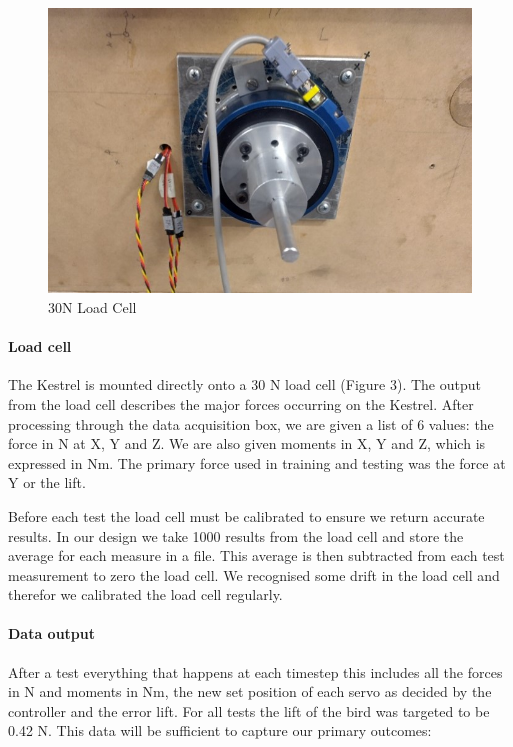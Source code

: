     \begin{figure}
        \includegraphics[width=\textwidth/2]{./Resources/Fig3_load_cell.jpg}
        \caption{\label{fig:figure 3} 30N Load Cell}
    \end{figure}

   \paragraph{Load cell} The Kestrel is mounted directly onto a 30 N load cell (Figure 3). The
   output from the load cell describes the major forces occurring on the
   Kestrel. After processing through the data acquisition box, we are given
   a list of 6 values: the force in N at X, Y and Z. We are also given
   moments in X, Y and Z, which is expressed in Nm. The primary force used
    in training and testing was the force at Y or the lift.

    Before each test the load cell must be calibrated to ensure we return
    accurate results. In our design we take 1000 results from the load cell
    and store the average for each measure in a file. This average is then
    subtracted from each test measurement to zero the load cell. We recognised
    some drift in the load cell and therefor we calibrated the load cell regularly.

    \paragraph{Data output}
    After a test everything that happens at each timestep this includes all the
    forces in N and moments in Nm, the new set position of each servo as decided by
    the controller and the error lift. For all tests the lift of the bird was
    targeted to be 0.42 N. \vspace{\baselineskip}
    This data will be sufficient to capture our primary outcomes:

